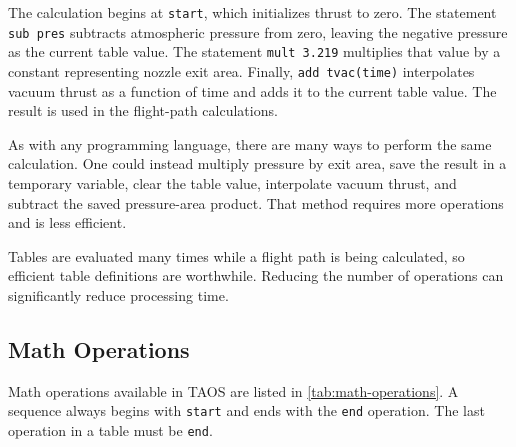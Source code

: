 The calculation begins at \texttt{start}, which initializes thrust to zero. The
statement \texttt{sub pres} subtracts atmospheric pressure from zero, leaving the
negative pressure as the current table value. The statement \texttt{mult 3.219}
multiplies that value by a constant representing nozzle exit area. Finally,
\texttt{add tvac(time)} interpolates vacuum thrust as a function of time and adds it
to the current table value. The result is used in the flight-path calculations.

As with any programming language, there are many ways to perform the same
calculation. One could instead multiply pressure by exit area, save the result in a
temporary variable, clear the table value, interpolate vacuum thrust, and subtract the
saved pressure-area product. That method requires more operations and is less
efficient.

Tables are evaluated many times while a flight path is being calculated, so efficient
table definitions are worthwhile. Reducing the number of operations can
significantly reduce processing time.

\subsection{Math Operations}\label{sec:table-math-operations}

Math operations available in TAOS are listed in \cref{tab:math-operations}. A
sequence always begins with \texttt{start} and ends with the \texttt{end} operation.
The last operation in a table must be \texttt{end}.

